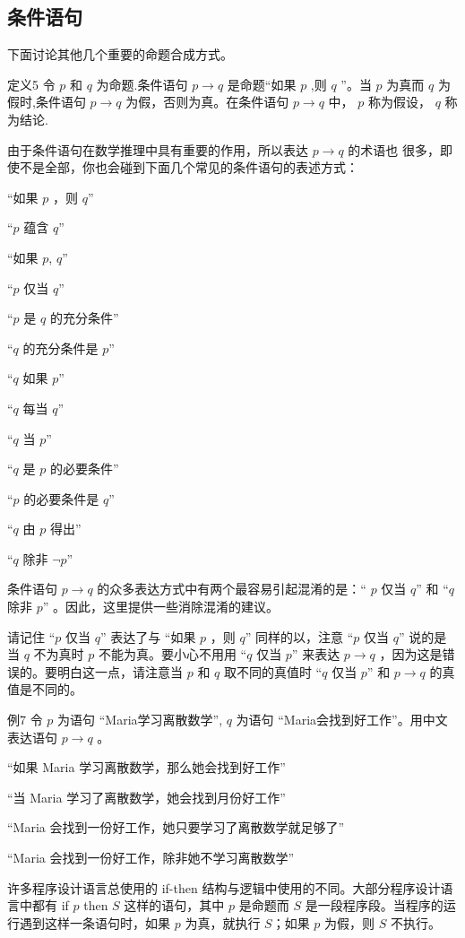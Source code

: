 \subsection{条件语句}
下面讨论其他几个重要的命题合成方式。

定义5  令
$p$
和
$q$
为命题.条件语句
$p \to q$
是命题“如果
$p$
,则
$q$
”。当
$p$
为真而
$q$
为假时,条件语句
$p \to q$
为假，否则为真。在条件语句
$p \to q$
中，
$p$
称为假设，
$q$
称为结论.

由于条件语句在数学推理中具有重要的作用，所以表达
$p \to q$
的术语也 很多，即使不是全部，你也会碰到下面几个常见的条件语句的表述方式：

 “如果
 $p$
 ，则
 $q$”

 “$p$
 蕴含
 $q$”

 “如果
 $p$,
 $q$”

 “$p$
 仅当
 $q$”
 
 “$p$
 是
 $q$
 的充分条件”

 “$q$
 的充分条件是
 $p$”

 “$q$
 如果
 $p$”

 “$q$
 每当
 $q$”

 “$q$
 当
 $p$”


 “$q$
 是
 $p$
 的必要条件”

 “$p$
 的必要条件是
 $q$”

 “$q$
 由
 $p$
 得出”

 “$q$
 除非
 $\neg p$”

条件语句 
$p \to q$
的众多表达方式中有两个最容易引起混淆的是：“ 
$p$
仅当
$q$”
和
“$q$
除非
$p$”
。因此，这里提供一些消除混淆的建议。

请记住
“$p$
仅当
$q$”
表达了与
“如果
$p$
，则
$q$”
同样的以，注意
“$p$
仅当
$q$”
说的是当
$q$
不为真时
$p$
不能为真。要小心不用用
“$q$
仅当
$p$”
来表达
$p \to q$
，因为这是错误的。要明白这一点，请注意当
$p$
和
$q$
取不同的真值时
“$q$
仅当
$p$”
和
$p \to q$
的真值是不同的。


例7 令
$p$
为语句 “Maria学习离散数学”,
$q$
为语句 “Maria会找到好工作”。用中文表达语句
$p \to q$
。

“如果 Maria 学习离散数学，那么她会找到好工作”

“当 Maria 学习了离散数学，她会找到月份好工作”

“Maria 会找到一份好工作，她只要学习了离散数学就足够了”

“Maria 会找到一份好工作，除非她不学习离散数学”


许多程序设计语言总使用的 if-then 结构与逻辑中使用的不同。大部分程序设计语言中都有 if
$p$
then
$S$
这样的语句，其中
$p$
是命题而
$S$
是一段程序段。当程序的运行遇到这样一条语句时，如果
$p$
为真，就执行
$S$；如果
$p$
为假，则
$S$
不执行。  

